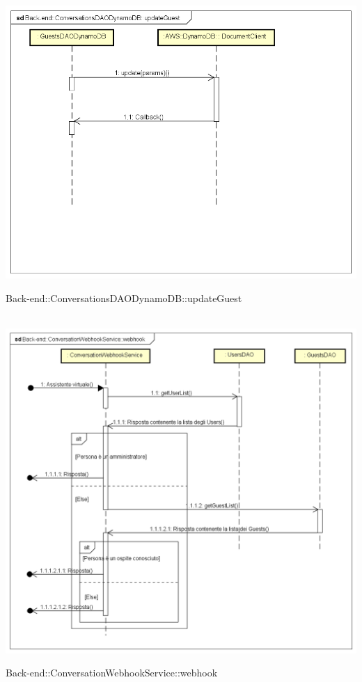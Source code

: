 \\ \includegraphics[width=\textwidth,height=\textheight,keepaspectratio]{images/diagrams/back-end/Ufficial_Backend/Back-end__ConversationsDAODynamoDB__updateGuest.png} 	\caption{Back-end::ConversationsDAODynamoDB::updateGuest}
\\ \includegraphics[width=\textwidth,height=\textheight,keepaspectratio]{images/diagrams/back-end/Ufficial_Backend/Back-end__ConversationWebhookService__webhook.png} 	\caption{Back-end::ConversationWebhookService::webhook}
